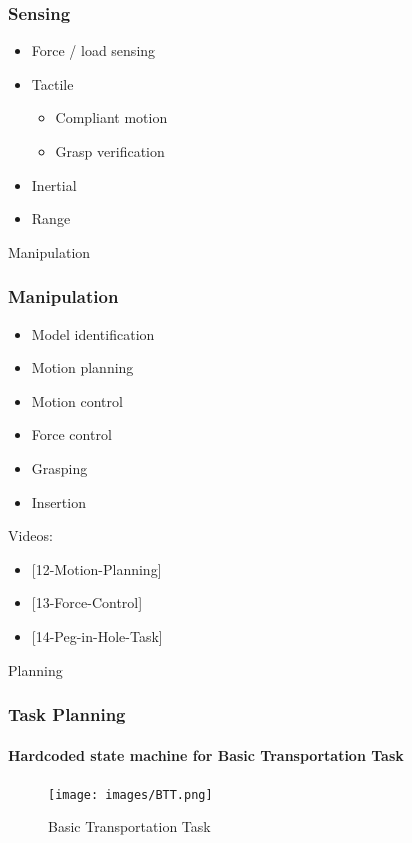 \documentclass{beamer}
\begin{document}
\begin{frame}
\frametitle{Sensing}
\begin{itemize}
    \item <1->Force / load sensing
    \item <2->Tactile
        \begin{itemize}
            \item Compliant motion
            \item Grasp verification
        \end{itemize}
    \item <3->Inertial
    \item <4->Range
\end{itemize}
\end{frame}

\begin{frame}[standout]
     Manipulation
\end{frame}


\begin{frame}
\frametitle{Manipulation}
\begin{itemize}
    \item <1->Model identification
    \item <2->Motion planning
    \item <3->Motion control
    \item <4->Force control
    \item <5->Grasping
    \item <6->Insertion
\end{itemize}

{\footnotesize
Videos:
\begin{itemize}
\item <2->{[12-Motion-Planning]}
\item <4->{[13-Force-Control]}
\item <6->{[14-Peg-in-Hole-Task]}
\end{itemize}}
\end{frame}

\begin{frame}[standout]
     Planning
\end{frame}

\begin{frame}
\frametitle{Task Planning}
\framesubtitle{Hardcoded state machine for Basic Transportation Task}
\begin{figure}[H]
     \centering
     \texttt{[image: images/BTT.png]}
     \caption{Basic Transportation Task~\cite{Lima}}
     \label{fig:btt}
\end{figure}
\end{frame}
\end{document}
